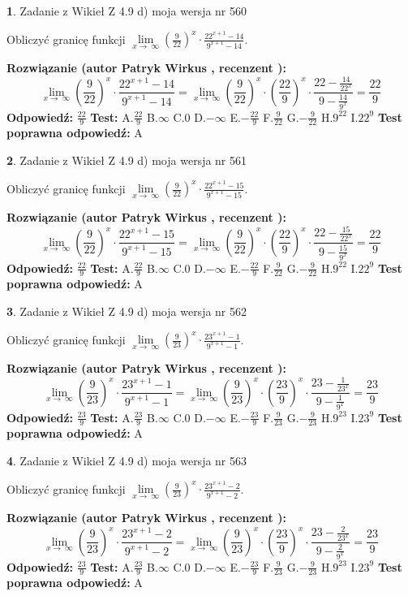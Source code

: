 \documentclass[12pt, a4paper]{article}
\theoremstyle{definition} %
\newtheorem{zad}{}
\newcommand{\zadStart}[1]{\begin{zad}#1\newline}
\newcommand{\zadStop}{\end{zad}}
\newcommand{\rozwStart}[2]{\noindent \textbf{Rozwiązanie (autor #1 , recenzent #2): }\newline}
\newcommand{\rozwStop}{\newline}
\newcommand{\odpStart}{\noindent \textbf{Odpowiedź:}\newline}
\newcommand{\odpStop}{\newline}
\newcommand{\testStart}{\noindent \textbf{Test:}\newline}
\newcommand{\testStop}{\newline}
\newcommand{\kluczStart}{\noindent \textbf{Test poprawna odpowiedź:}\newline}
\newcommand{\kluczStop}{\newline}
\begin{document}
\zadStart{Zadanie z Wikieł Z 4.9 d) moja wersja nr 560}


Obliczyć granicę funkcji  $\lim\limits_{x\to\ \infty}(\frac{9}{22})^{x}\cdot\frac{22^{x+1}-14}{9^{x+1}-14}$.
\zadStop
\rozwStart{Patryk Wirkus}{}
$$\lim\limits_{x\to\ \infty}(\frac{9}{22})^{x}\cdot\frac{22^{x+1}-14}{9^{x+1}-14}=\lim\limits_{x\to\ \infty}(\frac{9}{22})^{x}\cdot(\frac{22}{9})^{x} \cdot \frac{22-\frac{14}{22^{x}}}{9-\frac{14}{9^{x}}} = \frac{22}{9}$$
\rozwStop
\odpStart
$\frac{22}{9}$
\odpStop
\testStart
A.$\frac{22}{9}$ B.$\infty$ C.$0$ D.$-\infty$ E.$-\frac{22}{9}$
F.$\frac{9}{22}$ G.$-\frac{9}{22}$
H.$9^{22}$
I.$22^{9}$
\testStop
\kluczStart
A
\kluczStop



\zadStart{Zadanie z Wikieł Z 4.9 d) moja wersja nr 561}


Obliczyć granicę funkcji  $\lim\limits_{x\to\ \infty}(\frac{9}{22})^{x}\cdot\frac{22^{x+1}-15}{9^{x+1}-15}$.
\zadStop
\rozwStart{Patryk Wirkus}{}
$$\lim\limits_{x\to\ \infty}(\frac{9}{22})^{x}\cdot\frac{22^{x+1}-15}{9^{x+1}-15}=\lim\limits_{x\to\ \infty}(\frac{9}{22})^{x}\cdot(\frac{22}{9})^{x} \cdot \frac{22-\frac{15}{22^{x}}}{9-\frac{15}{9^{x}}} = \frac{22}{9}$$
\rozwStop
\odpStart
$\frac{22}{9}$
\odpStop
\testStart
A.$\frac{22}{9}$ B.$\infty$ C.$0$ D.$-\infty$ E.$-\frac{22}{9}$
F.$\frac{9}{22}$ G.$-\frac{9}{22}$
H.$9^{22}$
I.$22^{9}$
\testStop
\kluczStart
A
\kluczStop



\zadStart{Zadanie z Wikieł Z 4.9 d) moja wersja nr 562}


Obliczyć granicę funkcji  $\lim\limits_{x\to\ \infty}(\frac{9}{23})^{x}\cdot\frac{23^{x+1}-1}{9^{x+1}-1}$.
\zadStop
\rozwStart{Patryk Wirkus}{}
$$\lim\limits_{x\to\ \infty}(\frac{9}{23})^{x}\cdot\frac{23^{x+1}-1}{9^{x+1}-1}=\lim\limits_{x\to\ \infty}(\frac{9}{23})^{x}\cdot(\frac{23}{9})^{x} \cdot \frac{23-\frac{1}{23^{x}}}{9-\frac{1}{9^{x}}} = \frac{23}{9}$$
\rozwStop
\odpStart
$\frac{23}{9}$
\odpStop
\testStart
A.$\frac{23}{9}$ B.$\infty$ C.$0$ D.$-\infty$ E.$-\frac{23}{9}$
F.$\frac{9}{23}$ G.$-\frac{9}{23}$
H.$9^{23}$
I.$23^{9}$
\testStop
\kluczStart
A
\kluczStop



\zadStart{Zadanie z Wikieł Z 4.9 d) moja wersja nr 563}


Obliczyć granicę funkcji  $\lim\limits_{x\to\ \infty}(\frac{9}{23})^{x}\cdot\frac{23^{x+1}-2}{9^{x+1}-2}$.
\zadStop
\rozwStart{Patryk Wirkus}{}
$$\lim\limits_{x\to\ \infty}(\frac{9}{23})^{x}\cdot\frac{23^{x+1}-2}{9^{x+1}-2}=\lim\limits_{x\to\ \infty}(\frac{9}{23})^{x}\cdot(\frac{23}{9})^{x} \cdot \frac{23-\frac{2}{23^{x}}}{9-\frac{2}{9^{x}}} = \frac{23}{9}$$
\rozwStop
\odpStart
$\frac{23}{9}$
\odpStop
\testStart
A.$\frac{23}{9}$ B.$\infty$ C.$0$ D.$-\infty$ E.$-\frac{23}{9}$
F.$\frac{9}{23}$ G.$-\frac{9}{23}$
H.$9^{23}$
I.$23^{9}$
\testStop
\kluczStart
A
\kluczStop
\end{document}
